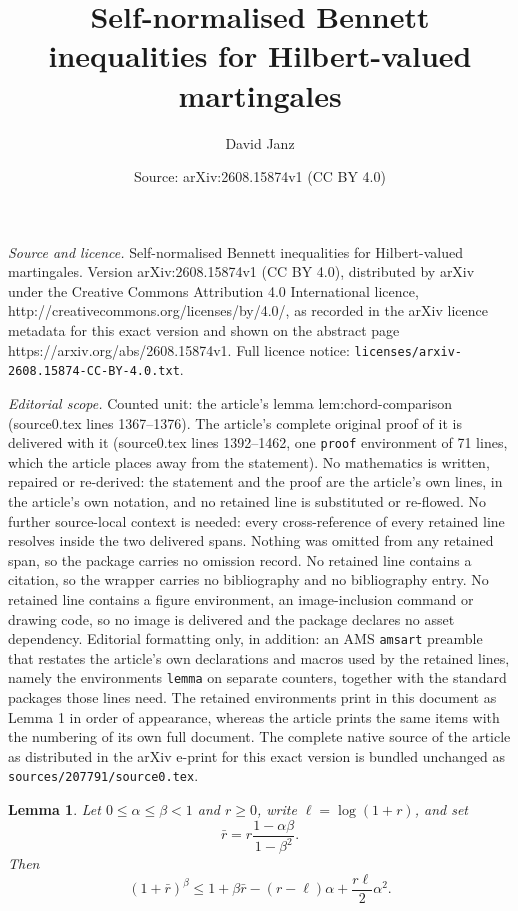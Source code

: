 \documentclass[10pt,a4paper]{amsart}
\title{Self-normalised Bennett inequalities for Hilbert-valued martingales}
\author{David Janz}
\date{Source: arXiv:2608.15874v1 (CC BY 4.0)}
\newtheorem{lemma}{Lemma}
\begin{document}
\maketitle

\noindent\emph{Source and licence.} Self-normalised Bennett inequalities for Hilbert-valued martingales. Version arXiv:2608.15874v1 (CC BY 4.0), distributed by arXiv under the Creative Commons Attribution 4.0 International licence, http://creativecommons.org/licenses/by/4.0/, as recorded in the arXiv licence metadata for this exact version and shown on the abstract page https://arxiv.org/abs/2608.15874v1. Full licence notice: \texttt{licenses/arxiv-2608.15874-CC-BY-4.0.txt}.\par\smallskip

\noindent\textit{Editorial scope.} Counted unit: the article's lemma lem:chord-comparison (source0.tex lines 1367--1376). The article's complete original proof of it is delivered with it (source0.tex lines 1392--1462, one \texttt{proof} environment of 71 lines, which the article places away from the statement). No mathematics is written, repaired or re-derived: the statement and the proof are the article's own lines, in the article's own notation, and no retained line is substituted or re-flowed.  No further source-local context is needed: every cross-reference of every retained line resolves inside the two delivered spans.  Nothing was omitted from any retained span, so the package carries no omission record.  No retained line contains a citation, so the wrapper carries no bibliography and no bibliography entry.  No retained line contains a figure environment, an image-inclusion command or drawing code, so no image is delivered and the package declares no asset dependency.  Editorial formatting only, in addition: an AMS \texttt{amsart} preamble that restates the article's own declarations and macros used by the retained lines, namely the environments \texttt{lemma} on separate counters, together with the standard packages those lines need.  The retained environments print in this document as Lemma 1 in order of appearance, whereas the article prints the same items with the numbering of its own full document.  The complete native source of the article as distributed in the arXiv e-print for this exact version is bundled unchanged as \texttt{sources/207791/source0.tex}.
\begin{lemma}\label{lem:chord-comparison}
Let $0\leq\alpha\leq\beta<1$ and $r\geq0$, write $\ell=\log(1+r)$, and set
\[
  \bar r=r\frac{1-\alpha\beta}{1-\beta^2}.
\]
Then
\[
  (1+\bar r)^\beta\leq1+\beta\bar r-(r-\ell)\alpha+\frac{r\ell}{2}\alpha^2.
\]
\end{lemma}
\end{document}
